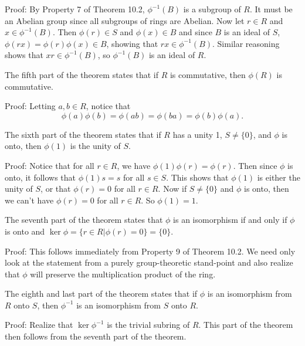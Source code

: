\documentclass[12pt]{article}
\begin{document}
Proof: By Property 7 of Theorem 10.2, $\phi^{-1}(B)$ is a subgroup of $R$.  It must be an
Abelian group since all subgroups of rings are Abelian.  Now let $r\in R$ and $x\in\phi^{-1}(B)$.
Then $\phi(r)\in S$ and $\phi(x)\in B$ and since $B$ is an ideal of $S$, $\phi(rx)=\phi(r)\phi(x)\in B$,
showing that $rx\in\phi^{-1}(B)$.  Similar reasoning shows that $xr\in\phi^{-1}(B)$, so $\phi^{-1}(B)$
is an ideal of $R$.

The fifth part of the theorem states that if $R$ is commutative, then $\phi(R)$ is commutative.

Proof: Letting $a,b\in R$, notice that
\begin{equation*}
\phi(a)\phi(b)=\phi(ab)=\phi(ba)=\phi(b)\phi(a).
\end{equation*}

The sixth part of the theorem states that if $R$ has a unity 1, $S\neq\{0\}$, and $\phi$ is onto,
then $\phi(1)$ is the unity of $S$.

Proof: Notice that for all $r\in R$, we have $\phi(1)\phi(r)=\phi(r)$.  Then since $\phi$ is onto,
it follows that $\phi(1)s=s$ for all $s\in S$.  This shows that $\phi(1)$ is either the unity of $S$,
or that $\phi(r)=0$ for all $r\in R$.  Now if $S\neq\{0\}$ and $\phi$ is onto, then we can't
have $\phi(r)=0$ for all $r\in R$.  So $\phi(1)=1$.

The seventh part of the theorem states that $\phi$ is an isomorphism if and only if $\phi$ is onto and
$\ker\phi=\{r\in R|\phi(r)=0\}=\{0\}$.

Proof: This follows immediately from Property 9 of Theorem 10.2.  We need only look at the statement
from a purely group-theoretic stand-point and also realize that $\phi$ will preserve the multiplication
product of the ring.

The eighth and last part of the theorem states that if $\phi$ is an isomorphism from $R$ onto $S$,
then $\phi^{-1}$ is an isomorphism from $S$ onto $R$.

Proof: Realize that $\ker\phi^{-1}$ is the trivial subring of $R$.  This part of the theorem then
follows from the seventh part of the theorem.
\end{document}
